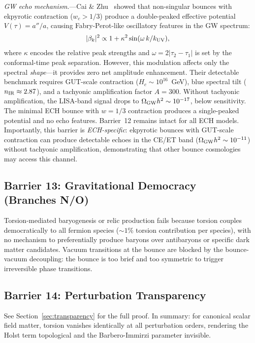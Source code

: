\documentclass[aps,prd,twocolumn,superscriptaddress,showpacs,preprintnumbers,nofootinbib,longbibliography,floatfix]{revtex4-2}
\begin{document}
\textit{GW echo mechanism.}---Cai \& Zhu~\cite{Cai:2026echoes} showed that non-singular bounces with ekpyrotic contraction ($w_c > 1/3$) produce a double-peaked effective potential $V(\tau) = a''/a$, causing Fabry-Perot-like oscillatory features in the GW spectrum:
\begin{equation}\label{eq:gw_echo}
|\beta_k|^2 \propto 1 + \kappa^2\sin(\omega\, k/k_{\rm UV}),
\end{equation}
where $\kappa$ encodes the relative peak strengths and $\omega = 2|\tau_2 - \tau_1|$ is set by the conformal-time peak separation. However, this modulation affects only the spectral \emph{shape}---it provides zero net amplitude enhancement. Their detectable benchmark requires GUT-scale contraction ($H_c \sim 10^{16}$~GeV), blue spectral tilt ($n_{\rm IR} \approx 2.87$), and a tachyonic amplification factor $A = 300$. Without tachyonic amplification, the LISA-band signal drops to $\Omega_{\rm GW}h^2 \sim 10^{-17}$, below sensitivity. The minimal ECH bounce with $w = 1/3$ contraction produces a single-peaked potential and no echo features. Barrier~12 remains intact for all ECH models. Importantly, this barrier is \emph{ECH-specific}: ekpyrotic bounces with GUT-scale contraction can produce detectable echoes in the CE/ET band ($\Omega_{\rm GW}h^2 \sim 10^{-11}$) without tachyonic amplification, demonstrating that other bounce cosmologies may access this channel.

\subsection{Barrier 13: Gravitational Democracy (Branches N/O)}

Torsion-mediated baryogenesis or relic production fails because torsion couples democratically to all fermion species ($\sim 1\%$ torsion contribution per species), with no mechanism to preferentially produce baryons over antibaryons or specific dark matter candidates. Vacuum transitions at the bounce are blocked by the bounce-vacuum decoupling: the bounce is too brief and too symmetric to trigger irreversible phase transitions.

\subsection{Barrier 14: Perturbation Transparency}

See Section~\ref{sec:transparency} for the full proof. In summary: for canonical scalar field matter, torsion vanishes identically at all perturbation orders, rendering the Holst term topological and the Barbero-Immirzi parameter invisible.
\end{document}
